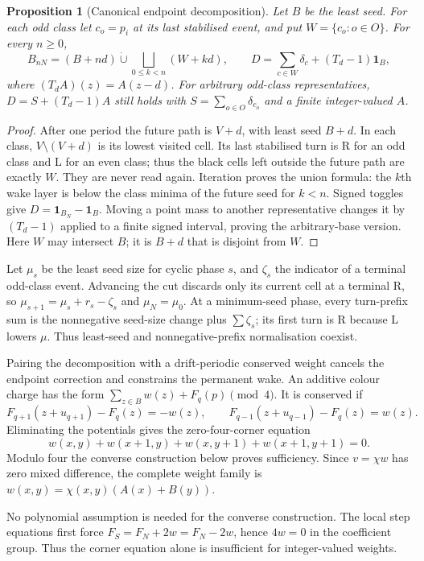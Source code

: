 \documentclass[11pt,letterpaper]{article}
\newtheorem{proposition}[theorem]{Proposition}
\newcommand{\che}{\chi}
\begin{document}
\begin{proposition}[Canonical endpoint decomposition]\label{prop:endpoint}
Let $B$ be the least seed. For each odd class let $c_o=p_i$ at its
last stabilised event, and put $W=\{c_o:o\in O\}$. For every $n\ge0$,
\[
B_{nN}=(B+nd)\mathbin{\dot\cup}
 \bigsqcup_{0\le k<n}(W+kd),\qquad
D=\sum_{c\in W}\delta_c+(T_d-1)\mathbf1_B,
\]
where $(T_dA)(z)=A(z-d)$. For arbitrary odd-class representatives,
$D=S+(T_d-1)A$ still holds with $S=\sum_{o\in O}\delta_{c_o}$
and a finite integer-valued $A$.
\end{proposition}
\begin{proof}
After one period the future path is $V+d$, with least seed $B+d$.
In each class, $V\setminus(V+d)$ is its lowest visited cell. Its
last stabilised turn is R for an odd class and L for an even class;
thus the black cells left outside the future path are exactly $W$.
They are never read again. Iteration proves the union formula: the
$k$th wake layer is below the class minima of the future seed for $k<n$.
Signed toggles give $D=\mathbf1_{B_N}-\mathbf1_B$. Moving a point mass
to another representative changes it by $(T_d-1)$ applied to a finite
signed interval, proving the arbitrary-base version. Here $W$ may
intersect $B$; it is $B+d$ that is disjoint from $W$.
\end{proof}

Let $\mu_s$ be the least seed size for cyclic phase $s$, and $\zeta_s$
the indicator of a terminal odd-class event. Advancing the cut discards
only its current cell at a terminal R, so
$\mu_{s+1}=\mu_s+r_s-\zeta_s$ and $\mu_N=\mu_0$.
At a minimum-seed phase, every turn-prefix sum is the nonnegative
seed-size change plus $\sum\zeta_s$; its first turn is R because L
lowers $\mu$. Thus least-seed and nonnegative-prefix normalisation coexist.

Pairing the decomposition with a drift-periodic conserved weight cancels
the endpoint correction and constrains the permanent wake. An additive
colour charge has the form
$\sum_{z\in B}w(z)+F_q(p)\pmod4$. It is conserved if
\[
F_{q+1}(z+u_{q+1})-F_q(z)=-w(z),\qquad
F_{q-1}(z+u_{q-1})-F_q(z)=w(z).
\]
Eliminating the potentials gives the zero-four-corner equation
\[
w(x,y)+w(x+1,y)+w(x,y+1)+w(x+1,y+1)=0.
\]
Modulo four the converse construction below proves sufficiency.
Since $v=\che w$ has zero mixed difference, the complete weight family is
$w(x,y)=\che(x,y)(A(x)+B(y))$.


No polynomial assumption is needed for the converse construction. The local step equations first force
$F_S=F_N+2w=F_N-2w$, hence $4w=0$ in the coefficient group.
Thus the corner equation alone is insufficient for integer-valued weights.
\end{document}
